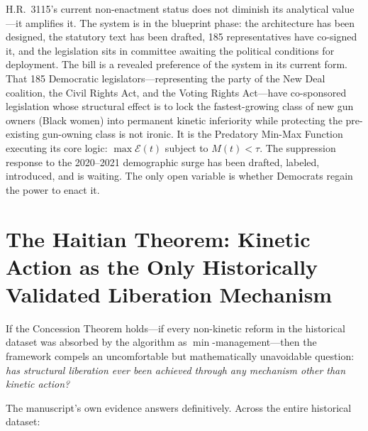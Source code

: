 H.R.\ 3115's current non-enactment status does not diminish its analytical value---it amplifies it. The system is in the blueprint phase: the architecture has been designed, the statutory text has been drafted, 185 representatives have co-signed it, and the legislation sits in committee awaiting the political conditions for deployment. The bill is a revealed preference of the system in its current form. That 185 Democratic legislators---representing the party of the New Deal coalition, the Civil Rights Act, and the Voting Rights Act---have co-sponsored legislation whose structural effect is to lock the fastest-growing class of new gun owners (Black women) into permanent kinetic inferiority while protecting the pre-existing gun-owning class is not ironic. It is the Predatory Min-Max Function executing its core logic: $\max \mathcal{E}(t)$ subject to $M(t) < \tau$. The suppression response to the 2020--2021 demographic surge has been drafted, labeled, introduced, and is waiting. The only open variable is whether Democrats regain the power to enact it.

\section{The Haitian Theorem: Kinetic Action as the Only Historically Validated Liberation Mechanism}
\label{sec:haitian_theorem}

If the Concession Theorem holds---if every non-kinetic reform in the historical dataset was absorbed by the algorithm as $\min$-management---then the framework compels an uncomfortable but mathematically unavoidable question: \textit{has structural liberation ever been achieved through any mechanism other than kinetic action?}

The manuscript's own evidence answers definitively. Across the entire historical dataset:

